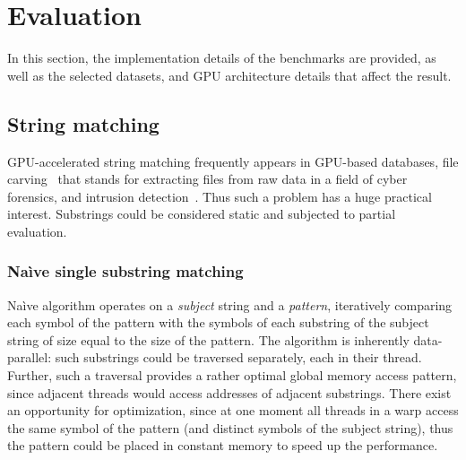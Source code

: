 \section{Evaluation}
In this section, the implementation details of the benchmarks are provided, as well as the selected datasets, and GPU architecture details that affect the result.

\subsection{String matching}
GPU-accelerated string matching frequently appears in GPU-based data\-bases, file carving~\cite{DataCarving,GPU-carving} that stands for extracting files from raw data in a field of cyber forensics, and intrusion detection~\cite{GPU-IDS}. Thus such a problem has a huge practical interest. Substrings could be considered static and subjected to partial evaluation.

\subsubsection{Na\`ive single substring matching}\label{naive-single}
Na\`ive algorithm operates on a \emph{subject} string and a \emph{pattern}, iteratively comparing each symbol of the pattern with the symbols of each substring of the subject string of size equal to the size of the pattern. The algorithm is inherently data-parallel: such substrings could be traversed separately, each in their thread. Further, such a traversal provides a rather optimal  global memory access pattern, since adjacent threads would access addresses of adjacent substrings. There exist an opportunity for optimization, since at one moment all threads in a warp access the same symbol of the pattern (and distinct symbols of the subject string), thus the pattern could be placed in constant memory to speed up the performance.

 
